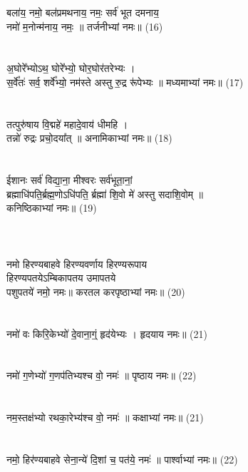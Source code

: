 बला॑य॒ नमो॒ बल॑प्रमथनाय॒ नमः॒ सर्व॑ भूत दमनाय॒ \\
नमो॑ म॒नोन्म॑नाय॒ नमः॒ ॥ तर्जनीभ्यां नमः॥ (16)\\
{\small{}}\\
\\
अ॒घोरे᳚भ्योऽथ॒ घोरे᳚भ्यो॒ घोर॒घोर॑तरेभ्यः । \\
स॒र्वे᳚तः॑ सर्व॒ शर्वे᳚भ्यो॒ नम॑स्ते अस्तु रु॒द्र रू॑पेभ्यः ॥ मध्यमाभ्यां नमः॥ (17)\\
{\small{}}\\
\\
तत्पुरु॑षाय वि॒द्महे॑ महादे॒वाय॑ धीमहि । \\
तन्नो॑ रुद्रः प्रचो॒दया᳚त् ॥ अनामिकाभ्यां नमः॥ (18)\\
{\small{}}\\
\\
ईशानः सर्व॑ विद्या॒ना॒ मीश्वरः सर्व॑भूता॒नां॒\\
ब्रह्माधि॑पति॒र्ब्रह्म॒णोऽधि॑पति॒ र्ब्रह्मा॑ शि॒वो मे॑ अस्तु सदाशि॒वोम् ॥\\
कनिष्ठिकाभ्यां नमः॥ (19)\\
{\small{}}\\
\\
{\small{}}\\
नमो हिरण्यबाहवे हिरण्यवर्णाय हिरण्यरूपाय \\
हिरण्यपतयेऽम्बिकापतय उमापतये\\
पशुपतये॑ नमो॒ नमः॥ करतल करपृष्ठाभ्यां नमः॥ (20)\\
{\small{}}\\
\\
नमो॑ वः किरि॒केभ्यो॑ दे॒वाना॒ग्ं॒ हृद॑येभ्यः । हृदयाय नमः॥ (21)\\
{\small{}}\\
\\
नमो॑ ग॒णेभ्यो॑ ग॒णप॑तिभ्यश्च वो॒ नमः॑ ॥ पृष्ठाय नमः॥ (22)\\
{\small{}}\\
\\
नम॒स्तक्ष॑भ्यो रथका॒रेभ्य॑श्च वो॒  नमः॑ ॥ कक्षाभ्यां नमः॥ (21)\\
{\small{}}\\
\\
नमो॒ हिर॑ण्यबाहवे सेना॒न्ये॑ दि॒शां च॒ पत॑ये॒  नमः॑ ॥ पार्श्वाभ्यां नमः॥ (22)\\
